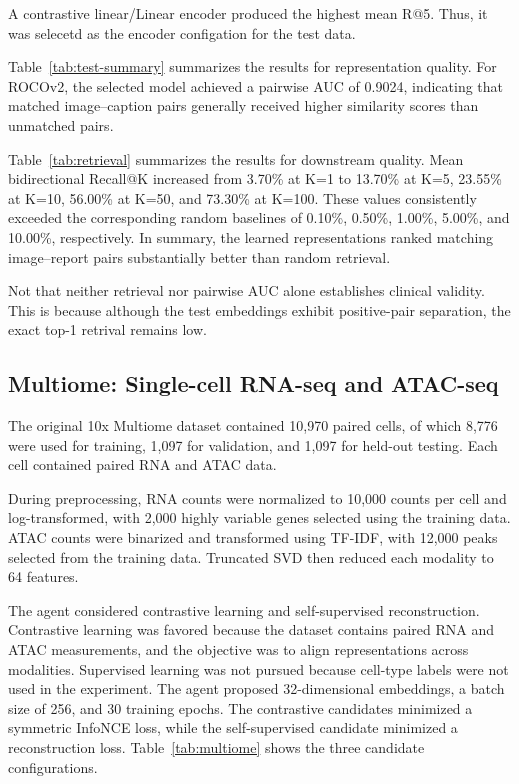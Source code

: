 \documentclass[10pt]{article}
\begin{document}
A contrastive linear/Linear encoder produced the highest mean R@5. 
Thus, it was selecetd as the encoder configation for the test data. 

Table~\ref{tab:test-summary} summarizes the results for representation quality. 
For ROCOv2, the selected model achieved a pairwise AUC of 0.9024, 
indicating that matched image--caption pairs generally received higher 
similarity scores than unmatched pairs. 

Table~\ref{tab:retrieval} summarizes the results for downstream quality. 
Mean bidirectional Recall@K increased from 3.70\% at K=1 to 13.70\% at K=5, 
23.55\% at K=10, 56.00\% at K=50, and 73.30\% at K=100. These values 
consistently exceeded the corresponding random baselines of 0.10\%, 0.50\%, 1.00\%, 
5.00\%, and 10.00\%, respectively. In summary, the learned representations 
ranked matching image--report pairs substantially better than random retrieval.

Not that neither retrieval nor pairwise AUC alone establishes clinical validity. This is because although the test embeddings exhibit positive-pair separation,
the exact top-1 retrival remains low. 

\subsection{Multiome: Single-cell RNA-seq and ATAC-seq}

The original 10x Multiome dataset contained 10,970 paired cells, of which 
8,776 were used for training, 1,097 for validation, and 1,097 for held-out 
testing. Each cell contained paired RNA and ATAC data.

During preprocessing, RNA counts were normalized to 10,000 counts per cell and 
log-transformed, with 2,000 highly variable genes selected using the training data. 
ATAC counts were binarized and transformed using TF-IDF, with 12,000 peaks selected 
from the training data. Truncated SVD then reduced each modality to 64 features. 

The agent considered contrastive learning and self-supervised reconstruction. 
Contrastive learning was favored because the dataset contains paired RNA and ATAC 
measurements, and the objective was to align representations across modalities. 
Supervised learning was not pursued because cell-type labels were not used in the 
experiment. The agent proposed 32-dimensional embeddings, a batch size of 256, and 
30 training epochs. The contrastive candidates minimized a symmetric InfoNCE loss, 
while the self-supervised candidate minimized a reconstruction loss. 
Table~\ref{tab:multiome} shows the three candidate configurations.
\end{document}
